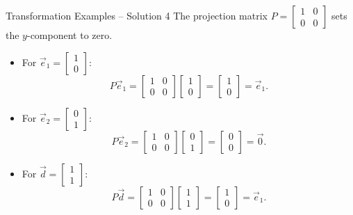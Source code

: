 \documentclass{beamer}
\begin{document}
\begin{frame}{Transformation Examples -- Solution 4}
  The projection matrix \(P = \begin{bmatrix} 1 & 0 \\ 0 & 0 \end{bmatrix}\) sets the \(y\)-component to zero.
  \begin{itemize}
    \item For \(\vec{e}_1 = \begin{bmatrix} 1 \\ 0 \end{bmatrix}\):
    \begin{equation}
      P\vec{e}_1 = \begin{bmatrix} 1 & 0 \\ 0 & 0 \end{bmatrix}\begin{bmatrix} 1 \\ 0 \end{bmatrix} = \begin{bmatrix} 1 \\ 0 \end{bmatrix} = \vec{e}_1.
    \end{equation}
    \item For \(\vec{e}_2 = \begin{bmatrix} 0 \\ 1 \end{bmatrix}\):
    \begin{equation}
      P\vec{e}_2 = \begin{bmatrix} 1 & 0 \\ 0 & 0 \end{bmatrix}\begin{bmatrix} 0 \\ 1 \end{bmatrix} = \begin{bmatrix} 0 \\ 0 \end{bmatrix} = \vec{0}.
    \end{equation}
    \item For \(\vec{d} = \begin{bmatrix} 1 \\ 1 \end{bmatrix}\):
    \begin{equation}
      P\vec{d} = \begin{bmatrix} 1 & 0 \\ 0 & 0 \end{bmatrix}\begin{bmatrix} 1 \\ 1 \end{bmatrix} = \begin{bmatrix} 1 \\ 0 \end{bmatrix} = \vec{e}_1.
    \end{equation}
  \end{itemize}
\end{frame}
\end{document}
